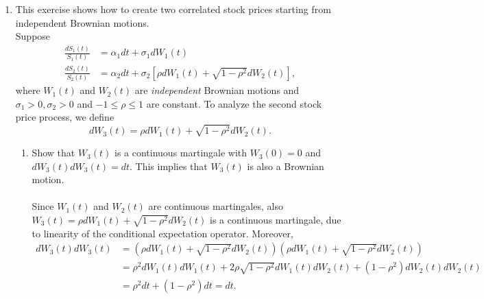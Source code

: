 \documentclass[11pt,a4,table]{article}
\begin{document}
\begin{enumerate}
\begin{enumerate}
    \end{enumerate}
    
    
    \item This exercise shows how to create two correlated stock prices starting from independent Brownian motions.\\
    Suppose
    \begin{align}
        \frac{dS_1(t)}{S_1(t)} &= \alpha_1 dt + \sigma_1 dW_1(t)\\
        \frac{dS_2(t)}{S_2(t)} &= \alpha_2 dt + \sigma_2 \left[ \rho dW_1(t) + \sqrt{1-\rho^2} dW_2(t)\right],
    \end{align}
    where $W_1(t)$ and $W_2(t)$ are \textit{independent} Brownian motions and $\sigma_1>0,\sigma_2>0$ and $-1\leq \rho \leq 1$ are constant. To analyze the second stock price process, we define
    \begin{equation*}
        dW_3(t) = \rho dW_1(t) + \sqrt{1-\rho^2} dW_2(t).
    \end{equation*}
    
    \begin{enumerate}
        \item Show that $W_3(t)$ is a continuous martingale with $W_3(0)=0$ and $dW_3(t) dW_3(t) = dt$. This implies that $W_3(t)$ is also a Brownian motion.\\\\
        Since $W_1(t)$ and $W_2(t)$ are continuous martingales, also $W_3(t) = \rho dW_1(t) + \sqrt{1-\rho^2} dW_2(t)$ is a continuous martingale, due to linearity of the conditional expectation operator. Moreover,
        \begin{align*}
            dW_3(t)dW_3(t) &= \left(\rho dW_1(t) + \sqrt{1-\rho^2} dW_2(t)\right) \left(\rho dW_1(t) + \sqrt{1-\rho^2} dW_2(t)\right)\\
            &= \rho^2 dW_1(t)dW_1(t) + 2\rho\sqrt{1-\rho^2} dW_1(t)dW_2(t) + (1-\rho^2) dW_2(t)dW_2(t)\\
            &= \rho^2 dt + (1-\rho^2) dt= dt.
        \end{align*}
        

\end{enumerate}
\end{enumerate}
\end{document}
